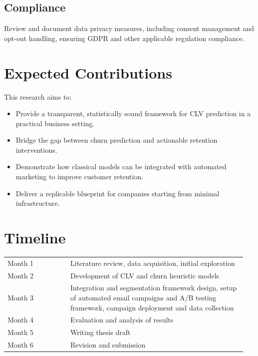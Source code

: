 \documentclass[12pt,a4paper]{article}
\begin{document}
\subsection{Compliance}
Review and document data privacy measures, including consent management and opt-out handling, ensuring GDPR and other applicable regulation compliance.

\section{Expected Contributions}
This research aims to:
\begin{itemize}
    \item Provide a transparent, statistically sound framework for CLV prediction in a practical business setting.
    \item Bridge the gap between churn prediction and actionable retention interventions.
    \item Demonstrate how classical models can be integrated with automated marketing to improve customer retention.
    \item Deliver a replicable blueprint for companies starting from minimal infrastructure.
\end{itemize}

\section{Timeline}
\begin{tabular}{p{0.25\linewidth} p{0.7\linewidth}}
Month 1 & Literature review, data acquisition, initial exploration \\
Month 2 & Development of CLV and churn heuristic models \\
Month 3 & Integration and segmentation framework design, setup of automated email campaigns and A/B testing framework, campaign deployment and data collection \\
Month 4 & Evaluation and analysis of results \\
Month 5 & Writing thesis draft \\
Month 6 & Revision and submission \\
\end{tabular}













\newpage

\begin{thebibliography}{9}


\end{thebibliography}
\end{document}
